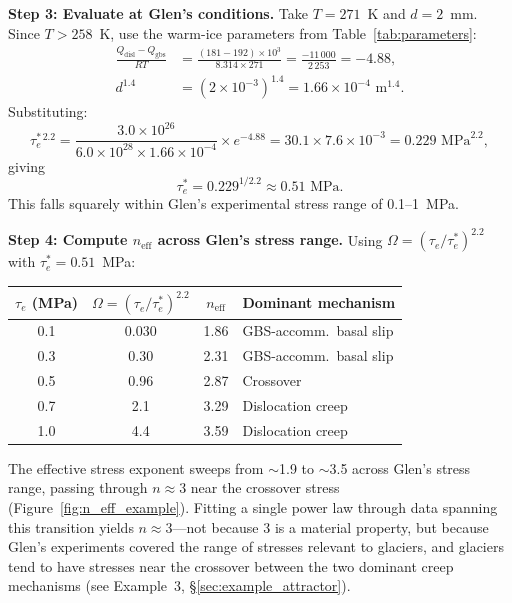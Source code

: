 \documentclass[11pt]{article}
\begin{document}
\medskip
\noindent\textbf{Step 3: Evaluate at Glen's conditions.}  Take $T = 271$~K and $d = 2$~mm.  Since $T > 258$~K, use the warm-ice parameters from Table~\ref{tab:parameters}:
\begin{align}
  \frac{Q_{\text{disl}} - Q_{\text{gbs}}}{RT} &= \frac{(181 - 192) \times 10^3}{8.314 \times 271} = \frac{-11\,000}{2\,253} = -4.88, \\[4pt]
  d^{1.4} &= (2 \times 10^{-3})^{1.4} = 1.66 \times 10^{-4} \text{ m}^{1.4}.
\end{align}
Substituting:
\begin{equation}
  \tau_e^{*\,2.2} = \frac{3.0 \times 10^{26}}{6.0 \times 10^{28} \times 1.66 \times 10^{-4}} \times e^{-4.88} = 30.1 \times 7.6 \times 10^{-3} = 0.229 \text{ MPa}^{2.2},
\end{equation}
giving
\begin{equation}
  \boxed{\tau_e^* = 0.229^{1/2.2} \approx 0.51 \text{ MPa}.}
\end{equation}
This falls squarely within Glen's experimental stress range of 0.1--1~MPa.

\medskip
\noindent\textbf{Step 4: Compute $n_{\text{eff}}$ across Glen's stress range.}  Using $\Omega = (\tau_e / \tau_e^*)^{2.2}$ with $\tau_e^* = 0.51$~MPa:

\begin{center}
\begin{tabular}{cccl}
\toprule
$\tau_e$ (MPa) & $\Omega = (\tau_e/\tau_e^*)^{2.2}$ & $n_{\text{eff}}$ & Dominant mechanism \\
\midrule
0.1 & 0.030 & 1.86 & GBS-accomm.\ basal slip \\
0.3 & 0.30  & 2.31 & GBS-accomm.\ basal slip \\
0.5 & 0.96  & 2.87 & Crossover \\
0.7 & 2.1   & 3.29 & Dislocation creep \\
1.0 & 4.4   & 3.59 & Dislocation creep \\
\bottomrule
\end{tabular}
\end{center}

\noindent The effective stress exponent sweeps from $\sim$1.9 to $\sim$3.5 across Glen's stress range, passing through $n \approx 3$ near the crossover stress (Figure~\ref{fig:n_eff_example}).  Fitting a single power law through data spanning this transition yields $n \approx 3$---not because 3 is a material property, but because Glen's experiments covered the range of stresses relevant to glaciers, and glaciers tend to have stresses near the crossover between the two dominant creep mechanisms (see Example~3, \S\ref{sec:example_attractor}).
\end{document}

